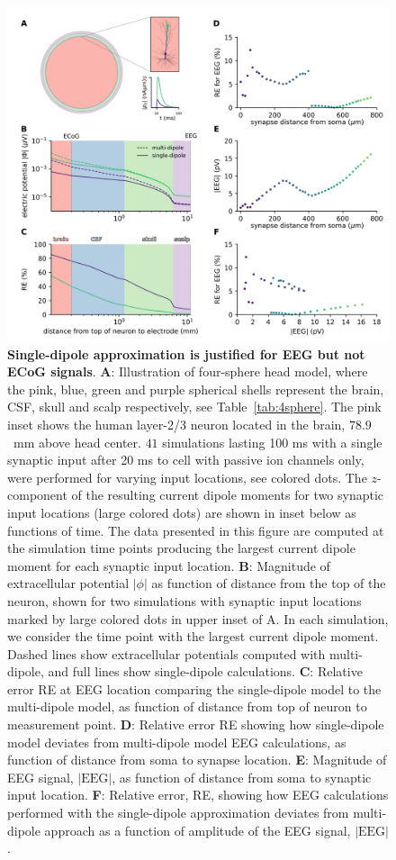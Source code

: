 \documentclass[preprint,10pt,authoryear]{elsarticle}
\begin{document}
\begin{figure}[H]
	\centering
	\includegraphics[width=1.0\textwidth]{figure2_eeg.png}
	\caption{\textbf{Single-dipole approximation is justified for EEG but not ECoG signals}. 
		\textbf{A}: Illustration of four-sphere head model, where the pink, blue, green and purple spherical shells represent the brain, CSF, skull and scalp respectively, see Table~\ref{tab:4sphere}. The pink inset shows the human layer-2/3 neuron \citep{EYAL2016} located in the brain, $78.9$~\si{mm} above head center. $41$ simulations lasting 100 ms with a single synaptic input after 20 ms to cell with passive ion channels only, were performed for varying input locations, see colored dots. 
		The $z$-component of the resulting current dipole moments for two synaptic input locations (large colored dots) are shown in inset below as functions of time. The data presented in this figure are computed at the simulation time points producing the largest current dipole moment for each synaptic input location.
		\textbf{B}: Magnitude of extracellular potential $|\phi|$ as function of distance from the top of the neuron, shown for two simulations with synaptic input locations marked by large colored dots in upper inset of A. In each simulation, we consider the time point with the largest current dipole moment. Dashed lines show extracellular potentials computed with multi-dipole, and full lines show single-dipole calculations.
		\textbf{C}: Relative error RE at EEG location comparing the single-dipole model to the multi-dipole model, as function of distance from top of neuron to measurement point.
		\textbf{D}: Relative error RE showing how single-dipole model deviates from multi-dipole model EEG calculations, as function of distance from soma to synapse location.
		\textbf{E}: Magnitude of EEG signal, $|\text{EEG}|$, as function of distance from soma to synaptic input location.
		\textbf{F}: Relative error, RE, showing how EEG calculations performed with the single-dipole approximation deviates from multi-dipole approach as a function of amplitude of the EEG signal, $|\text{EEG}|$.}
	\label{fig:compare_multi_single_dipole}
\end{figure}
\end{document}
